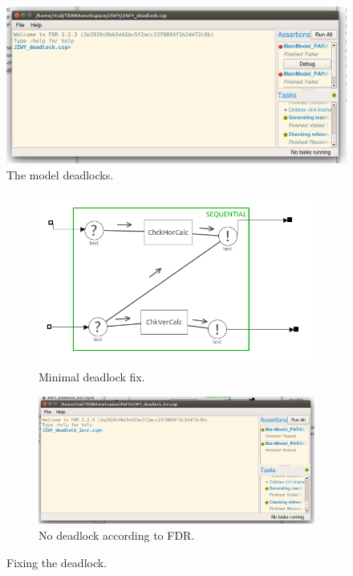\documentclass[a4paper,twoside,11pt]{article}
\begin{document}
\begin{figure}
	\centering
	\includegraphics[width=\textwidth]{./images/4-1_fdr.png}
	\caption{The model deadlocks.}
	\label{fig:4_1_fdr}
\end{figure}

\begin{figure}
	\begin{subfigure}{0.6\textwidth}
		\centering
		\includegraphics[width=\textwidth]{./images/4-2_contr.png}
		\caption{Minimal deadlock fix.}
		\label{sub:4_2_check}
	\end{subfigure}

	\begin{subfigure}{0.8\textwidth}
		\centering
		\includegraphics[width=\textwidth]{./images/4-2_fdr.png}
		\caption{No deadlock according to FDR.}
		\label{sub:4_2_fdr}
	\end{subfigure}
	\caption{Fixing the deadlock.}
\end{figure}
\end{document}
